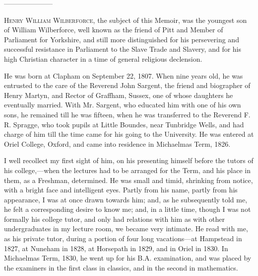 
———————


H\textsc{enry} W\textsc{illiam}
W\textsc{ilberforce}, the subject of
this Memoir, was the youngest son of William Wilberforce, well known
as the friend of Pitt and Member of Parliament for Yorkshire, and
still more distinguished for his persevering and successful resistance
in Parliament to the Slave Trade and Slavery, and for his high
Christian character in a time of general religious declension.

He was born at Clapham on September 22, 1807.
When nine years old, he was entrusted to the care of the Reverend John
Sargent, the friend and biographer of Henry Martyn, and Rector of
Graffham, Sussex, one of whose daughters he eventually married. With
Mr. Sargent, who educated him with one of his own sons, he remained
till he was fifteen, when he was transferred to the Reverend F. R.
Spragge, who took pupils at Little Boundes, near Tunbridge Wells, and
had charge of him till the time came for his going to the University.
He was entered at Oriel College, Oxford, and came into residence in
Michaelmas Term, 1826.

I well recollect my first sight of him, on his
presenting himself before the tutors of his college,—when the
lectures had to be arranged for the Term, and his place in them, as a
Freshman, determined. He was small and timid, shrinking from notice,
with a bright face and intelligent eyes. Partly from his name, partly
from his appearance, I was at once drawn towards him; and, as he
subsequently told me, he felt a corresponding desire to know me; and,
in a little time, though I was not formally his college tutor, and
only had relations with him as with other undergraduates in my lecture
room, we became very intimate. He read with me, as his private tutor,
during a portion of four long vacations—at Hampstead in 1827, at
Nuneham in 1828, at Horsepath in 1829, and in Oriel in 1830. In
Michaelmas Term, 1830, he went up for his B.A. examination, and was
placed by the examiners in the first class in classics, and in the
second in mathematics.

